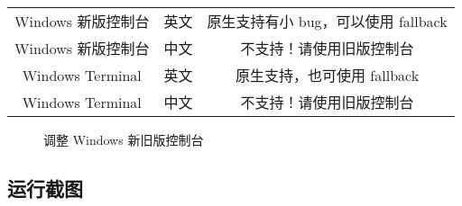 \documentclass[hyperref,UTF8,a4paper]{ctexart}
\newcommand{\includegraphicx}[1]{\maxsizebox{\textwidth}{\textheight}{\texttt{[image: \#1]}}}
\begin{document}
\begin{longtable}[]{@{}ccc@{}}
\begin{minipage}[t]{0.25\columnwidth}\centering
Windows 新版控制台\strut
\end{minipage} & \begin{minipage}[t]{0.09\columnwidth}\centering
英文\strut
\end{minipage} & \begin{minipage}[t]{0.46\columnwidth}\centering
原生支持有小 bug，可以使用 fallback\strut
\end{minipage}\tabularnewline
\begin{minipage}[t]{0.25\columnwidth}\centering
Windows 新版控制台\strut
\end{minipage} & \begin{minipage}[t]{0.09\columnwidth}\centering
中文\strut
\end{minipage} & \begin{minipage}[t]{0.46\columnwidth}\centering
不支持！请使用旧版控制台\strut
\end{minipage}\tabularnewline
\begin{minipage}[t]{0.25\columnwidth}\centering
Windows Terminal\strut
\end{minipage} & \begin{minipage}[t]{0.09\columnwidth}\centering
英文\strut
\end{minipage} & \begin{minipage}[t]{0.46\columnwidth}\centering
原生支持，也可使用 fallback\strut
\end{minipage}\tabularnewline
\begin{minipage}[t]{0.25\columnwidth}\centering
Windows Terminal\strut
\end{minipage} & \begin{minipage}[t]{0.09\columnwidth}\centering
中文\strut
\end{minipage} & \begin{minipage}[t]{0.46\columnwidth}\centering
不支持！请使用旧版控制台\strut
\end{minipage}\tabularnewline
\bottomrule
\end{longtable}

\begin{figure}[H]
\centering
\includegraphicx{img/wincon.png}
\caption{调整 Windows 新旧版控制台}
\end{figure}

\hypertarget{ux8fd0ux884cux622aux56fe}{%
\subsection{运行截图}\label{ux8fd0ux884cux622aux56fe}}
\end{document}
